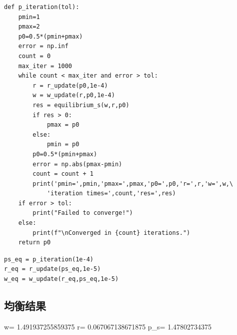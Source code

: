 \documentclass[a4paper, 12pt]{ctexart}
\begin{document}
\begin{lstlisting}
def p_iteration(tol):
    pmin=1
    pmax=2
    p0=0.5*(pmin+pmax)
    error = np.inf
    count = 0
    max_iter = 1000
    while count < max_iter and error > tol:
        r = r_update(p0,1e-4)
        w = w_update(r,p0,1e-4)
        res = equilibrium_s(w,r,p0)
        if res > 0:
            pmax = p0
        else:
            pmin = p0
        p0=0.5*(pmin+pmax)
        error = np.abs(pmax-pmin)
        count = count + 1
        print('pmin=',pmin,'pmax=',pmax,'p0=',p0,'r=',r,'w=',w,\
            'iteration times=',count,'res=',res)
    if error > tol:
        print("Failed to converge!")
    else:
        print(f"\nConverged in {count} iterations.")
    return p0
\end{lstlisting}

\begin{lstlisting}
ps_eq = p_iteration(1e-4)
r_eq = r_update(ps_eq,1e-5)
w_eq = w_update(r_eq,ps_eq,1e-5)
\end{lstlisting}

\subsection{均衡结果}
w= 1.491937255859375 r= 0.067067138671875 p\_s= 1.47802734375
\end{document}
